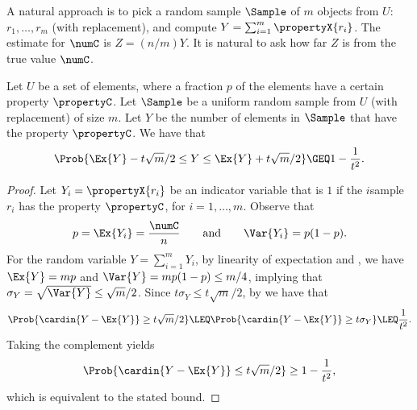 A natural approach is to pick a random sample $\Sample$ of $m$ objects
from $U$: $r_1, \ldots, r_m$ (with replacement), and compute
$Y = \sum_{i=1}^m \propertyX{r_i}$.  The estimate for $\numC$ is
$Z = (n/m) Y$. It is natural to ask how far $Z$ is from the true value
$\numC$.


\begin{lemma}
    Let $U$ be a set of elements, where a fraction $p$ of the elements
    have a certain property $\propertyC$. Let $\Sample$ be a uniform
    random sample from $U$ (with replacement) of size $m$. Let $Y$ be the
    number of elements in $\Sample$ that have the property
    $\propertyC$. We have that
    \begin{equation*}
        \Prob{ \Bigl. \Ex{Y} - t \sqrt{m}/2 \leq Y \leq \Ex{Y} + t \sqrt{m}/2
        } \GEQ 1- \frac{1}{t^2}.
    \end{equation*}
\end{lemma}
\begin{proof}
    Let $Y_i = \propertyX{r_i}$ be an indicator variable that is $1$ if
    the $i$\th sample $r_i$ has the property $\propertyC$, for
    $i=1,\ldots, m$.  Observe that
    \begin{equation*}
        p = \Ex{Y_i} = \frac{\numC}{n}
        \qquad\text{and}\qquad
        \Var{Y_i} = p(1-p).        
    \end{equation*}
    For the random variable $Y = \sum_{i=1}^m Y_i$, by linearity of
    expectation and , we have $\Ex{Y} = mp$ and
    $\Var{Y} = m p (1-p) \leq m/4$, implying that
    $\sigma_Y = \sqrt{\Var{Y}} \leq \sqrt{m}/2$. Since
    $t \sigma_Y \leq t \sqrt{m}/2$, by  we have that
    \begin{equation*}
        \Prob{ \cardin{Y - \Ex{Y}} \geq t \sqrt{m}/2
           \Bigr.
        }
        \LEQ
        \Prob{\Bigl. \cardin{Y - \Ex{Y}} \geq t \sigma_Y}
        \LEQ
        \frac{1}{t^2}.
    \end{equation*}
    Taking the complement yields
    \begin{equation*}
        \Prob{ \cardin{Y - \Ex{Y}} \leq t \sqrt{m}/2 } \geq 1 - \frac{1}{t^2},
    \end{equation*}
    which is equivalent to the stated bound.
\end{proof}

